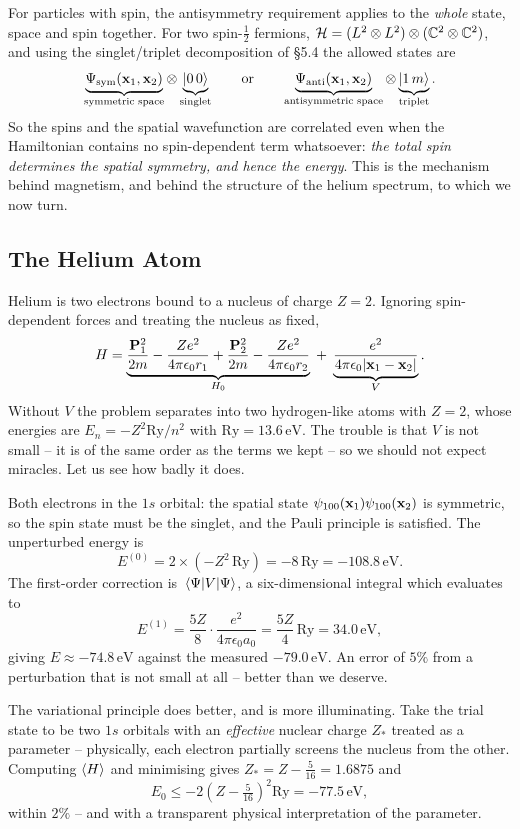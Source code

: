\documentclass[a4paper]{scrartcl}
\begin{document}
For particles with spin, the antisymmetry requirement applies to the \emph{whole} state, space and spin together. For two spin-$\frac12$ fermions, $\mathcal{H} = (L^2\otimes L^2)\otimes(\mathbb{C}^2\otimes\mathbb{C}^2)$, and using the singlet/triplet decomposition of \S5.4 the allowed states are
$$
\underbrace{\Psi_{\text{sym}}(\mathbf{x}_1, \mathbf{x}_2)}_{\text{symmetric space}} \otimes \underbrace{\ket{0\,0}}_{\text{singlet}}
\qquad \text{or} \qquad
\underbrace{\Psi_{\text{anti}}(\mathbf{x}_1,\mathbf{x}_2)}_{\text{antisymmetric space}} \otimes \underbrace{\ket{1\,m}}_{\text{triplet}}.
$$
So the spins and the spatial wavefunction are correlated even when the Hamiltonian contains no spin-dependent term whatsoever: \emph{the total spin determines the spatial symmetry, and hence the energy}. This is the mechanism behind magnetism, and behind the structure of the helium spectrum, to which we now turn.

\subsection{The Helium Atom}

Helium is two electrons bound to a nucleus of charge $Z = 2$. Ignoring spin-dependent forces and treating the nucleus as fixed,
$$
H = \underbrace{\frac{\mathbf{P}_1^2}{2m} - \frac{Ze^2}{4\pi\epsilon_0 r_1} + \frac{\mathbf{P}_2^2}{2m} - \frac{Ze^2}{4\pi\epsilon_0 r_2}}_{H_0} \;+\; \underbrace{\frac{e^2}{4\pi\epsilon_0\lvert\mathbf{x}_1 - \mathbf{x}_2\rvert}}_{V}.
$$
Without $V$ the problem separates into two hydrogen-like atoms with $Z=2$, whose energies are $E_n = -Z^2 \mathrm{Ry}/n^2$ with $\mathrm{Ry} = 13.6\,\mathrm{eV}$. The trouble is that $V$ is not small -- it is of the same order as the terms we kept -- so we should not expect miracles. Let us see how badly it does.

\begin{example}
    Both electrons in the $1s$ orbital: the spatial state $\psi_{100}(\mathbf{x}_1)\psi_{100}(\mathbf{x}_2)$ is symmetric, so the spin state must be the singlet, and the Pauli principle is satisfied. The unperturbed energy is
    $$
    E^{(0)} = 2\times\left(-Z^2\,\mathrm{Ry}\right) = -8\,\mathrm{Ry} = -108.8\,\mathrm{eV}.
    $$
    The first-order correction is $\mel{\Psi}{V}{\Psi}$, a six-dimensional integral which evaluates to
    $$
    E^{(1)} = \frac{5Z}{8}\cdot\frac{e^2}{4\pi\epsilon_0 a_0} = \frac{5Z}{4}\,\mathrm{Ry} = 34.0\,\mathrm{eV},
    $$
    giving $E \approx -74.8\,\mathrm{eV}$ against the measured $-79.0\,\mathrm{eV}$. An error of $5\%$ from a perturbation that is not small at all -- better than we deserve.

    The variational principle does better, and is more illuminating. Take the trial state to be two $1s$ orbitals with an \emph{effective} nuclear charge $Z_*$ treated as a parameter -- physically, each electron partially screens the nucleus from the other. Computing $\expval{H}$ and minimising gives $Z_* = Z - \frac{5}{16} = 1.6875$ and
    $$
    E_0 \leq -2\left(Z - \tfrac{5}{16}\right)^2 \mathrm{Ry} = -77.5\,\mathrm{eV},
    $$
    within $2\%$ -- and with a transparent physical interpretation of the parameter.
\end{example}
\end{document}

